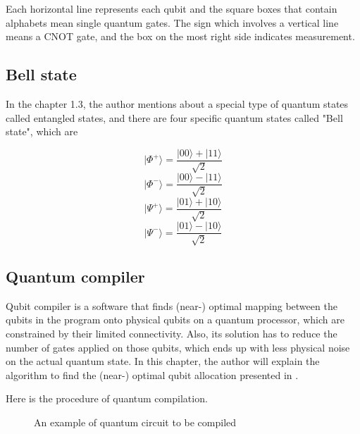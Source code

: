 Each horizontal line represents each qubit and the square boxes that contain alphabets mean single quantum gates.  The sign which involves a vertical line means a CNOT gate, and the box on the most right side indicates measurement. 

\subsection{Bell state}

In the chapter 1.3, the author mentions about a special type of quantum states called entangled states, and there are four specific quantum states called "Bell state", which are

$$ |\Phi^+\rangle = \frac{|00\rangle + |11\rangle}{\sqrt{2}}$$
$$ |\Phi^-\rangle = \frac{|00\rangle - |11\rangle}{\sqrt{2}}$$
$$ |\Psi^+\rangle = \frac{|01\rangle + |10\rangle}{\sqrt{2}}$$
$$ |\Psi^-\rangle = \frac{|01\rangle - |10\rangle}{\sqrt{2}}$$

\newpage
\subsection{Quantum compiler}

 Qubit compiler is a software that finds (near-) optimal mapping between the qubits in the program onto physical qubits on a quantum processor, which are constrained by their limited connectivity.  Also, its solution has to reduce the number of gates applied on those qubits, which ends up with less physical noise on the actual quantum state. In this chapter, the author will explain the algorithm to find the (near-) optimal qubit allocation presented in \cite{quantummapping}.
 
 Here is the procedure of quantum compilation.   
  \begin{figure}[ht]
  	\begin{center}

		\caption{An example of quantum circuit to be compiled}
	\end{center}
\end{figure}

